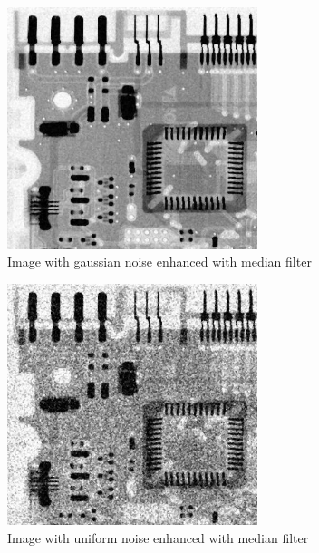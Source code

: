 \documentclass[10pt]{article}
\begin{document}
\begin{figure}[!ht]
	\centering
	\includegraphics[height=200pt]{./ex4/gaussmedian.jpg}
	\caption{Image with gaussian noise enhanced with median filter}
\end{figure}
\begin{figure}[!ht]
	\centering
	\includegraphics[height=200pt]{./ex4/unimedian.jpg}
	\caption{Image with uniform noise enhanced with median filter}
\end{figure}
\end{document}

